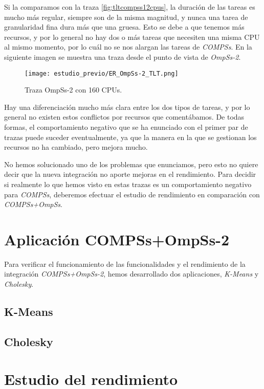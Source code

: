 Si la comparamos con la traza \ref{fig:tltcompss12cpus}, la duración de las tareas es mucho más regular, siempre son de la misma magnitud, y nunca una tarea de granularidad fina dura más que una gruesa. Esto se debe a que tenemos más recursos, y por lo general no hay dos o más tareas que necesiten una misma CPU al mismo momento, por lo cuál no se nos alargan las tareas de \textit{COMPSs}. En la siguiente imagen se muestra una traza desde el punto de vista de \textit{OmpSs-2}.

\begin{figure}[H]
	\centering 
	\caption{Traza OmpSs-2 con 160 CPUs.}
	\texttt{[image: estudio\_previo/ER\_OmpSs-2\_TLT.png]}
	\label{fig:tltompss160cpus}
\end{figure}

Hay una diferenciación mucho más clara entre los dos tipos de tareas, y por lo general no existen estos conflictos por recursos que comentábamos. De todas formas, el comportamiento negativo que se ha enunciado con el primer par de trazas puede suceder eventualmente, ya que la manera en la que se gestionan los recursos no ha cambiado, pero mejora mucho.
\par\bigskip
No hemos solucionado uno de los problemas que enunciamos, pero esto no quiere decir que la nueva integración no aporte mejoras en el rendimiento. Para decidir si realmente lo que hemos visto en estas trazas es un comportamiento negativo para \textit{COMPSs}, deberemos efectuar el estudio de rendimiento en comparación con \textit{COMPSs+OmpSs}.

\section{Aplicación COMPSs+OmpSs-2}

Para verificar el funcionamiento de las funcionalidades y el rendimiento de la integración \textit{COMPSs+OmpSs-2}, hemos desarrollado dos aplicaciones, \textit{K-Means} y \textit{Cholesky}.

\subsection{K-Means}



\subsection{Cholesky}



\section{Estudio del rendimiento}

